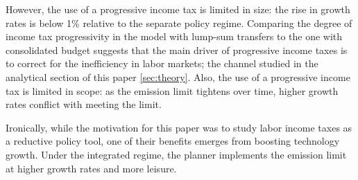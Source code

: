 However, the use of a progressive income tax is limited in size: the rise in growth rates is below 1\% relative to the separate policy regime. Comparing the degree of income tax progressivity in the model with lump-sum transfers to the one with consolidated budget suggests that the main driver of progressive income taxes is to correct for the inefficiency in labor markets; the channel studied in the analytical section of this paper \ref{sec:theory}. 
Also, the use of a progressive income tax is limited in scope: as the emission limit tightens over time, higher growth rates conflict with meeting the limit. 

Ironically, while the motivation for this paper was to study labor income taxes as a reductive policy tool, one of their benefits emerges from boosting technology growth. Under the integrated regime, the planner implements the emission limit at higher growth rates and more leisure. 



